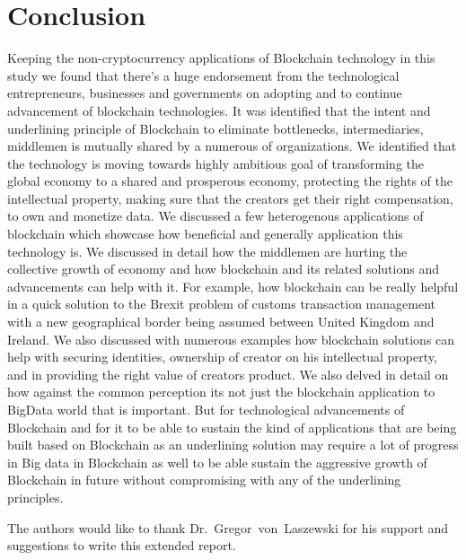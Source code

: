 \section{Conclusion}
Keeping the non-cryptocurrency applications of Blockchain technology in this study we found that there's a huge endorsement from the technological entrepreneurs, businesses and governments on adopting and to continue advancement of blockchain technologies. It was identified that the intent and underlining principle of Blockchain to eliminate bottlenecks, intermediaries, middlemen is mutually shared by a numerous of organizations. We identified that the technology is moving towards highly ambitious goal of transforming the global economy to a shared and prosperous economy, protecting the rights of the intellectual property, making sure that the creators get their right compensation, to own and monetize data. We discussed a few heterogenous applications of blockchain which showcase how beneficial and generally application this technology is. We discussed in detail how the middlemen are hurting the collective growth of economy and how blockchain and its related solutions and advancements can help with it. For example, how blockchain can be really helpful in a quick solution to the Brexit problem of customs transaction management with a new geographical border being assumed between United Kingdom and Ireland. We also discussed with numerous examples how blockchain solutions can help with securing identities, ownership of creator on his intellectual property, and in providing the right value of creators product. We also delved in detail on how against the common perception its not just the blockchain application to BigData world that is important. But for technological advancements of Blockchain and for it to be able to sustain the kind of applications that are being built based on Blockchain as an underlining solution may require a lot of progress in Big data in Blockchain as well to be able sustain the aggressive growth of Blockchain in future without compromising with any of the underlining principles.


\begin{acks}

The authors would like to thank Dr.~Gregor~von~Laszewski for his
support and suggestions to write this extended report.

\end{acks}



